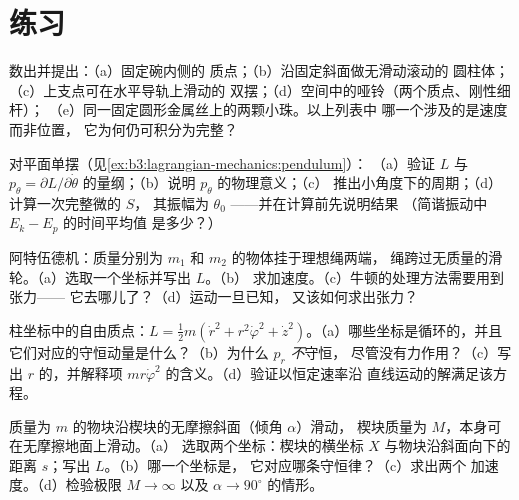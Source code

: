 \section{练习}

\begin{exercise}[$\star$]\label{exo:b3:lagrangian-mechanics:1}
数出并提出：（a）固定碗内侧的
质点；（b）沿固定斜面做无滑动滚动的
圆柱体；（c）上支点可在水平导轨上滑动的
双摆；（d）空间中的哑铃（两个质点、刚性细杆）；
（e）同一固定圆形金属丝上的两颗小珠。以上列表中
哪一个涉及的是速度而非位置，
它为何仍可积分为完整？
\end{exercise}

\begin{exercise}[$\star$]\label{exo:b3:lagrangian-mechanics:2}
对平面单摆（见\cref{ex:b3:lagrangian-mechanics:pendulum}）：
（a）验证 $L$ 与 $p_\theta =
\partial L/\partial\dot\theta$ 的量纲；（b）说明 $p_\theta$ 的物理意义；（c）
推出小角度下的周期；（d）计算一次完整微的 $S$，
其振幅为 $\theta_0$ ——并在计算前先说明结果
（简谐振动中 $E_k - E_p$ 的时间平均值
是多少？）
\end{exercise}

\begin{exercise}[$\star$]\label{exo:b3:lagrangian-mechanics:3}
阿特伍德机：质量分别为 $m_1$ 和 $m_2$ 的物体挂于理想绳两端，
绳跨过无质量的滑轮。（a）选取一个坐标并写出 $L$。（b）
求加速度。（c）牛顿的处理方法需要用到张力——
它去哪儿了？（d）运动一旦已知，
又该如何求出张力？
\end{exercise}

\begin{exercise}[$\star$]\label{exo:b3:lagrangian-mechanics:4}
柱坐标中的自由质点：$L = \tfrac12 m(\dot r^2 +
r^2\dot\varphi^2 + \dot z^2)$。（a）哪些坐标是循环的，并且
它们对应的守恒动量是什么？（b）为什么 $p_r$ \emph{不}守恒，
尽管没有力作用？（c）写出
$r$ 的，并解释项 $mr\dot\varphi^2$ 的含义。（d）验证以恒定速率沿
直线运动的解满足该方程。
\end{exercise}

\begin{exercise}[$\star\star$]\label{exo:b3:lagrangian-mechanics:5}
质量为 $m$ 的物块沿楔块的无摩擦斜面（倾角 $\alpha$）滑动，
楔块质量为 $M$，本身可在无摩擦地面上滑动。（a）
选取两个坐标：楔块的横坐标 $X$ 与物块沿斜面向下的
距离 $s$；写出 $L$。（b）哪一个坐标是，
它对应哪条守恒律？（c）求出两个
加速度。（d）检验极限 $M \to \infty$ 以及 $\alpha \to
90^\circ$ 的情形。
\end{exercise}


